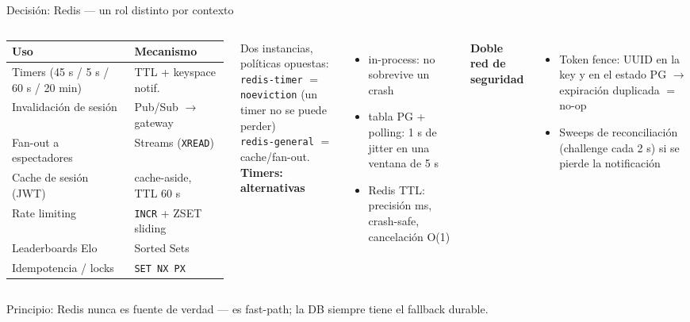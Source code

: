 \documentclass[aspectratio=169,10pt]{beamer}
\begin{document}
\begin{frame}{Decisión: Redis --- un rol distinto por contexto}
  \begin{columns}[T]
      \scriptsize
      \begin{tabular}{@{}ll@{}}
        \toprule
        Uso & Mecanismo \\
        \midrule
        Timers (45 s / 5 s / 60 s / 20 min) & TTL + keyspace notif. \\
        Invalidación de sesión & Pub/Sub $\to$ gateway \\
        Fan-out a espectadores & Streams (\texttt{XREAD}) \\
        Cache de sesión (JWT) & cache-aside, TTL 60 s \\
        Rate limiting & \texttt{INCR} + ZSET sliding \\
        Leaderboards Elo & Sorted Sets \\
        Idempotencia / locks & \texttt{SET NX PX} \\
        \bottomrule
      \end{tabular}
      \vspace{2mm}

      {\scriptsize Dos instancias, políticas opuestas:\\
      \textcolor{cRedis}{\texttt{redis-timer}} $=$ \texttt{noeviction} (un timer no se puede perder)\\
      \texttt{redis-general} $=$ cache/fan-out.}
      \textbf{\small Timers: alternativas}
      \begin{itemize}\scriptsize
        \item[\textcolor{cRedis}{\ding{55}}] in-process: no sobrevive un crash
        \item[\textcolor{cRedis}{\ding{55}}] tabla PG + polling: 1 s de jitter en una ventana de 5 s
        \item[\textcolor{cPG}{\ding{51}}] Redis TTL: precisión ms, crash-safe, cancelación O(1)
      \end{itemize}
      \vspace{1mm}
      \textbf{\small Doble red de seguridad}
      \begin{itemize}\scriptsize
        \item \alert{Token fence}: UUID en la key y en el estado PG $\to$ expiración duplicada $=$ no-op
        \item Sweeps de reconciliación (challenge cada 2 s) si se pierde la notificación
      \end{itemize}
  \end{columns}
  \vfill
  \centering\scriptsize\color{cGrey}
  Principio: Redis nunca es fuente de verdad --- es fast-path; la DB siempre tiene el fallback durable.
\end{frame}
\end{document}
